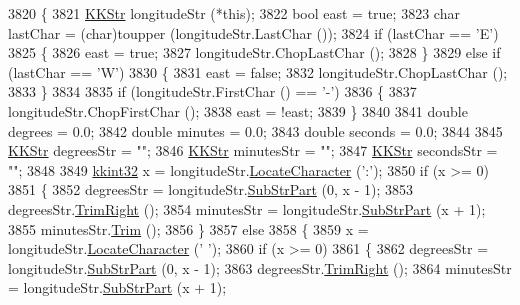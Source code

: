\begin{DoxyCode}
3820 \{
3821   \hyperlink{class_k_k_b_1_1_k_k_str}{KKStr} longitudeStr (*\textcolor{keyword}{this});
3822   \textcolor{keywordtype}{bool}  east = \textcolor{keyword}{true};
3823   \textcolor{keywordtype}{char}  lastChar = (char)toupper (longitudeStr.LastChar ());
3824   \textcolor{keywordflow}{if}  (lastChar == \textcolor{charliteral}{'E'})
3825   \{
3826     east = \textcolor{keyword}{true};
3827     longitudeStr.ChopLastChar ();
3828   \}
3829   \textcolor{keywordflow}{else} \textcolor{keywordflow}{if}  (lastChar == \textcolor{charliteral}{'W'})
3830   \{
3831     east = \textcolor{keyword}{false};
3832     longitudeStr.ChopLastChar ();
3833   \}
3834 
3835   \textcolor{keywordflow}{if}  (longitudeStr.FirstChar () == \textcolor{charliteral}{'-'})
3836   \{
3837     longitudeStr.ChopFirstChar ();
3838     east = !east;
3839   \}
3840 
3841   \textcolor{keywordtype}{double}  degrees = 0.0;
3842   \textcolor{keywordtype}{double}  minutes = 0.0;
3843   \textcolor{keywordtype}{double}  seconds = 0.0;
3844 
3845   \hyperlink{class_k_k_b_1_1_k_k_str}{KKStr}  degreesStr = \textcolor{stringliteral}{""};
3846   \hyperlink{class_k_k_b_1_1_k_k_str}{KKStr}  minutesStr = \textcolor{stringliteral}{""};
3847   \hyperlink{class_k_k_b_1_1_k_k_str}{KKStr}  secondsStr  = \textcolor{stringliteral}{""};
3848 
3849   \hyperlink{namespace_k_k_b_a8fa4952cc84fda1de4bec1fbdd8d5b1b}{kkint32}  x = longitudeStr.\hyperlink{class_k_k_b_1_1_k_k_str_ad738b238e609887bbf27841f359046cd}{LocateCharacter} (\textcolor{charliteral}{':'});
3850   \textcolor{keywordflow}{if}  (x >= 0)
3851   \{
3852     degreesStr = longitudeStr.\hyperlink{class_k_k_b_1_1_k_k_str_a5f20b2ddfc9f07c8ef99592810332ddb}{SubStrPart} (0, x - 1);
3853     degreesStr.\hyperlink{class_k_k_b_1_1_k_k_str_aa912161f17871e2d6fec7bbac033221c}{TrimRight} ();
3854     minutesStr = longitudeStr.\hyperlink{class_k_k_b_1_1_k_k_str_a5f20b2ddfc9f07c8ef99592810332ddb}{SubStrPart} (x + 1);
3855     minutesStr.\hyperlink{class_k_k_b_1_1_k_k_str_aa7fb03387fd7fabca05fba28271b7c20}{Trim} ();
3856   \}
3857   \textcolor{keywordflow}{else}
3858   \{
3859     x = longitudeStr.\hyperlink{class_k_k_b_1_1_k_k_str_ad738b238e609887bbf27841f359046cd}{LocateCharacter} (\textcolor{charliteral}{' '});
3860     \textcolor{keywordflow}{if}  (x >= 0)
3861     \{
3862       degreesStr = longitudeStr.\hyperlink{class_k_k_b_1_1_k_k_str_a5f20b2ddfc9f07c8ef99592810332ddb}{SubStrPart} (0, x - 1);
3863       degreesStr.\hyperlink{class_k_k_b_1_1_k_k_str_aa912161f17871e2d6fec7bbac033221c}{TrimRight} ();
3864       minutesStr = longitudeStr.\hyperlink{class_k_k_b_1_1_k_k_str_a5f20b2ddfc9f07c8ef99592810332ddb}{SubStrPart} (x + 1);

\end{DoxyCode}
